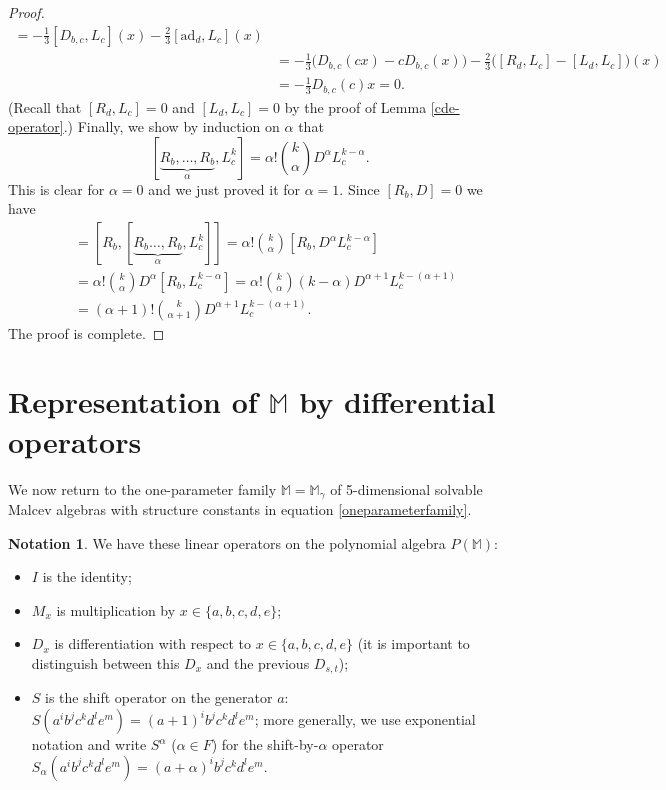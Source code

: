 \documentclass{amsart}
\theoremstyle{plain}
\theoremstyle{definition}
\newtheorem{notation}[lemma]{Notation}
\begin{document}
\begin{proof}
\begin{align*}
  =
  - \tfrac13 [ D_{b,c}, L_c ] (x) - \tfrac23 [ \mathrm{ad}_d, L_c ] (x)
  \\
  &=
  - \tfrac13 \big( D_{b,c} (cx) - c D_{b,c} (x) \big)
  - \tfrac23 \big( [ R_d, L_c ] - [ L_d, L_c] \big) (x)
  \\
  &=
  - \tfrac13 D_{b,c}(c) x = 0.
  \end{align*}
(Recall that $[ R_d, L_c ] = 0$ and $[ L_d, L_c] = 0$ by the proof of Lemma
\ref{cde-operator}.) Finally, we show by induction on $\alpha$ that
  \[
  [ \underbrace{R_b,\dots,R_b}_\alpha, L^k_c]
  =
  \alpha! \binom{k}{\alpha}
  D^{\alpha} L^{k-\alpha}_c.
  \]
This is clear for $\alpha = 0$ and we just proved it for $\alpha = 1$. Since $[
R_b, D ] = 0$ we have
  \allowdisplaybreaks
  \begin{align*}
  [ \underbrace{R_b,\dots,R_b}_{\alpha+1}, L^k_c ]
  &=
  [ R_b, [ \underbrace{R_b\dots,R_b}_\alpha, L^k_c ] ]
  =
  \alpha! \binom{k}{\alpha}
  [ R_b, D^{\alpha} L^{k-\alpha}_c ]
  \\
  &=
  \alpha! \binom{k}{\alpha}
  D^{\alpha} [ R_b, L^{k-\alpha}_c ]
  =
  \alpha! \binom{k}{\alpha} (k{-}\alpha)
  D^{\alpha+1} L^{k-(\alpha+1)}_c
  \\
  &=
  (\alpha{+}1)! \binom{k}{\alpha{+}1}
  D^{\alpha+1} L^{k-(\alpha+1)}_c.
  \end{align*}
The proof is complete.
\end{proof}


\section{Representation of $\mathbb{M}$ by differential operators}
\label{operatorsection}

We now return to the one-parameter family $\mathbb{M} = \mathbb{M}_\gamma$ of
5-dimensional solvable Malcev algebras with structure constants in equation
\eqref{oneparameterfamily}.

\begin{notation} \label{operatorsnotation}
We have these linear operators on the polynomial algebra $P({\mathbb M})$:
  \begin{itemize}
  \item $I$ is the identity;
  \item $M_x$ is multiplication by $x \in \{ a,b,c,d,e\}$;
  \item $D_x$ is differentiation with respect to $x \in \{a,b,c,d,e\}$ (it
      is important to distinguish between this $D_x$ and the previous
      $D_{s,t}$);
  \item $S$ is the shift operator on the generator $a$: $S(a^i b^j c^k
      d^{l} e^m) = ( a + 1 )^i b^j c^k d^{l} e^m$; more generally, we use
      exponential notation and write $S^\alpha$ ($\alpha \in F$) for the
      shift-by-$\alpha$ operator $S_{\alpha} (a^i b^j c^k d^{l} e^m) = ( a
      + \alpha )^i b^j c^k d^{l} e^m$.
  \end{itemize}
\end{notation}
\end{document}
